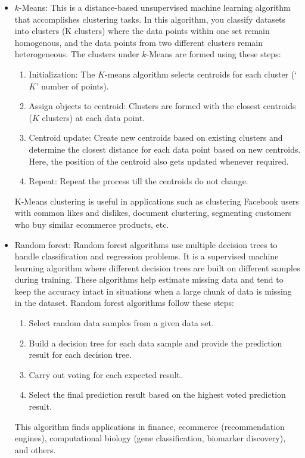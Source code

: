 \documentclass[11pt]{article}
\begin{document}
\begin{itemize}
\item $k$-Means: This is a distance-based unsupervised machine learning algorithm that accomplishes clustering tasks. In this algorithm, you classify datasets into clusters (K clusters) where the data 
points within one set remain homogenous, and the data points from two different clusters remain heterogeneous. The clusters under $k$-Means are formed using these steps:
\begin{enumerate} 
\item Initialization: The $K$-means algorithm selects centroids for each cluster (‘$K$’ number of points).
\item Assign objects to centroid: Clusters are formed with the closest centroids ($K$ clusters) at each data point.
\item Centroid update: Create new centroids based on existing clusters and determine the closest distance for each data point based on new centroids. Here, the position of the centroid also gets updated whenever required.
\item Repeat: Repeat the process till the centroids do not change.
\end{enumerate} 
K-Means clustering is useful in applications such as clustering Facebook users with common likes and dislikes, document clustering, segmenting customers who buy similar ecommerce products, etc.
\item Random forest: Random forest algorithms use multiple decision trees to handle classification and regression problems. It is a supervised machine learning algorithm where different decision trees are built on different samples during training. These algorithms help estimate missing data and tend to keep the accuracy intact in situations when a large chunk of data is missing in the dataset. Random forest algorithms follow these steps:

\begin{enumerate} 
\item Select random data samples from a given data set.
\item Build a decision tree for each data sample and provide the prediction result for each decision tree.
\item Carry out voting for each expected result.
\item  Select the final prediction result based on the highest voted prediction result.
\end{enumerate} 
This algorithm finds applications in finance, ecommerce (recommendation engines), computational biology (gene classification, biomarker discovery), and others.



\end{itemize} 
\end{document}
